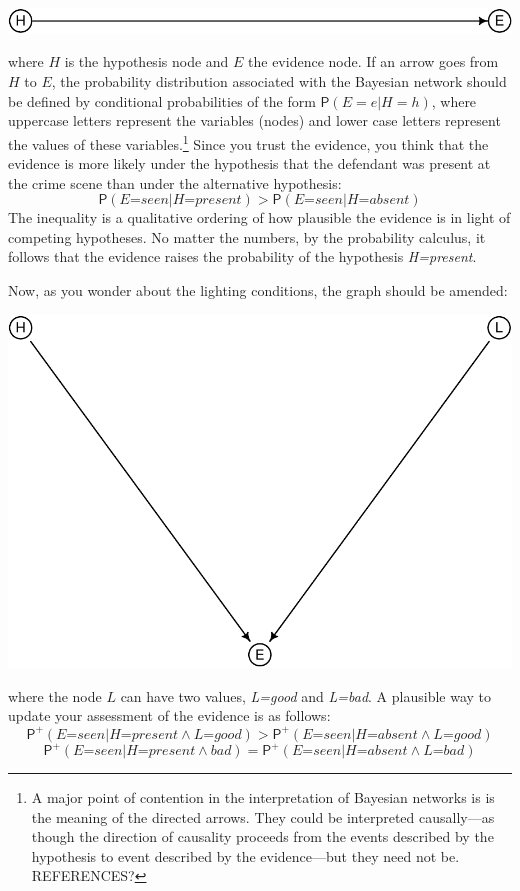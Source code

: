 \documentclass[
  11pt,
  dvipsnames,enabledeprecatedfontcommands]{scrartcl}
\newcommand{\pr}[1]{\ensuremath{\mathsf{P}(#1)}}
\newcommand{\ppr}[2]{\ensuremath{\mathsf{P}^{#1}(#2)}}
\begin{document}
\begin{center}\includegraphics[width=0.5\linewidth,height=0.3\textheight]{ReplyToSteeleStefansson2_files/figure-latex/heDAG-1} \end{center}

\noindent where \(H\) is the hypothesis node and \(E\) the evidence
node. If an arrow goes from \(H\) to \(E\), the probability distribution
associated with the Bayesian network should be defined by conditional
probabilities of the form \(\pr{E=e \vert H=h}\), where uppercase
letters represent the variables (nodes) and lower case letters represent
the values of these variables.\footnote{A major point of contention in
  the interpretation of Bayesian networks is is the meaning of the
  directed arrows. They could be interpreted causally---as though the
  direction of causality proceeds from the events described by the
  hypothesis to event described by the evidence---but they need not be.
  REFERENCES?} Since you trust the evidence, you think that the evidence
is more likely under the hypothesis that the defendant was present at
the crime scene than under the alternative hypothesis:
\[\pr{\textit{E=seen} \vert \textit{H=present}} > \pr{\textit{E=seen} \vert \textit{H=absent}}\]
The inequality is a qualitative ordering of how plausible the evidence
is in light of competing hypotheses. No matter the numbers, by the
probability calculus, it follows that the evidence raises the
probability of the hypothesis \textit{H=present}.

Now, as you wonder about the lighting conditions, the graph should be
amended:

\begin{center}\includegraphics[width=0.5\linewidth,height=0.1\textheight]{ReplyToSteeleStefansson2_files/figure-latex/lighting2DAG-1} \end{center}

\noindent where the node \(L\) can have two values, \textit{L=good} and
\textit{L=bad}. A plausible way to update your assessment of the
evidence is as follows:
\[\ppr{+}{\textit{E=seen} \vert \textit{H=present} \wedge \textit{L=good}} > \ppr{+}{\textit{E=seen} \vert \textit{H=absent} \wedge \textit{L=good}}\]
\[\ppr{+}{\textit{E=seen} \vert \textit{H=present} \wedge \textit{bad}} = \ppr{+}{\textit{E=seen} \vert \textit{H=absent} \wedge \textit{L=bad}}\]
\end{document}
